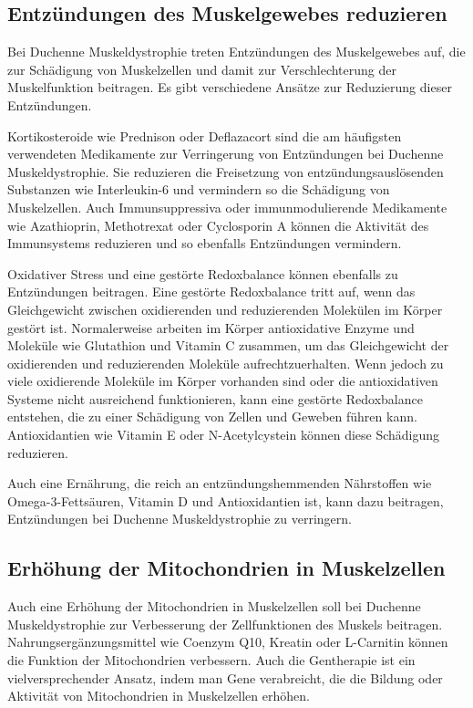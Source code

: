 \documentclass[fontsize=14pt,a4paper,headinclude,DIV=calc,automark]{scrbook}
\begin{document}
\subsection{Entzündungen des Muskelgewebes reduzieren}

Bei Duchenne Muskeldystrophie treten Entzündungen des Muskelgewebes auf, die zur Schädigung von Muskelzellen und damit zur Verschlechterung der Muskelfunktion beitragen. Es gibt verschiedene Ansätze zur Reduzierung dieser Entzündungen.

Kortikosteroide wie Prednison oder Deflazacort sind die am häufigsten verwendeten Medikamente zur Verringerung von Entzündungen bei Duchenne Muskeldystrophie. Sie reduzieren die Freisetzung von entzündungsauslösenden Substanzen wie Interleukin-6 und vermindern so die Schädigung von Muskelzellen. Auch Immunsuppressiva oder immunmodulierende Medikamente wie Azathioprin, Methotrexat oder Cyclosporin A können die Aktivität des Immunsystems reduzieren und so ebenfalls Entzündungen vermindern.

Oxidativer Stress und eine gestörte Redoxbalance können ebenfalls zu Entzündungen beitragen. Eine gestörte Redoxbalance tritt auf, wenn das Gleichgewicht zwischen oxidierenden und reduzierenden Molekülen im Körper gestört ist. Normalerweise arbeiten im Körper antioxidative Enzyme und Moleküle wie Glutathion und Vitamin C zusammen, um das Gleichgewicht der oxidierenden und reduzierenden Moleküle aufrechtzuerhalten. Wenn jedoch zu viele oxidierende Moleküle im Körper vorhanden sind oder die antioxidativen Systeme nicht ausreichend funktionieren, kann eine gestörte Redoxbalance entstehen, die zu einer Schädigung von Zellen und Geweben führen kann. Antioxidantien wie Vitamin E oder N-Acetylcystein können diese Schädigung reduzieren.

Auch eine Ernährung, die reich an entzündungshemmenden Nährstoffen wie Omega-3-Fettsäuren, Vitamin D und Antioxidantien ist, kann dazu beitragen, Entzündungen bei Duchenne Muskeldystrophie zu verringern.

\subsection{Erhöhung der Mitochondrien in Muskelzellen}

Auch eine Erhöhung der Mitochondrien in Muskelzellen soll bei Duchenne Muskeldystrophie zur Verbesserung der Zellfunktionen des Muskels beitragen. Nahrungsergänzungsmittel wie Coenzym Q10, Kreatin oder L-Carnitin können die Funktion der Mitochondrien verbessern. Auch die Gentherapie ist ein vielversprechender Ansatz, indem man Gene verabreicht, die die Bildung oder Aktivität von Mitochondrien in Muskelzellen erhöhen.
\end{document}
